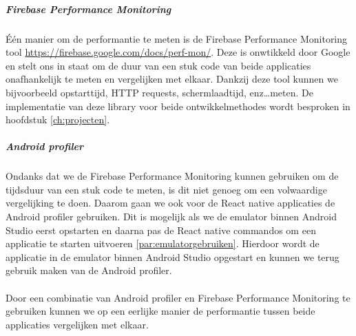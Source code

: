 \subparagraph{Firebase Performance Monitoring}
Één manier om de performantie te meten is de Firebase Performance Monitoring tool \url{https://firebase.google.com/docs/perf-mon/}. 
Deze is onwtikkeld door Google en stelt ons in staat om de duur van een stuk code van beide applicaties 
onafhankelijk te meten en vergelijken met elkaar. Dankzij deze tool kunnen we bijvoorbeeld opstarttijd, HTTP requests, 
schermlaadtijd, enz\dots meten. De implementatie van deze library voor beide ontwikkelmethodes wordt besproken 
in hoofdstuk \ref{ch:projecten}.

\subparagraph{Android profiler}
Ondanks dat we de Firebase Performance Monitoring kunnen gebruiken om de tijdsduur van een stuk code te meten, is dit 
niet genoeg om een volwaardige vergelijking te doen. Daarom gaan we ook voor de React native applicaties de Android 
profiler gebruiken. Dit is mogelijk als we de emulator binnen Android Studio eerst opstarten en daarna pas de React native 
commandos om een applicatie te starten uitvoeren \ref{par:emulatorgebruiken}. Hierdoor wordt de applicatie in de emulator 
binnen Android Studio opgestart en kunnen we terug gebruik maken van de Android profiler. 
\\\\
Door een combinatie van Android profiler en Firebase Performance Monitoring te gebruiken kunnen we op een eerlijke manier 
de performantie tussen beide applicaties vergelijken met elkaar.